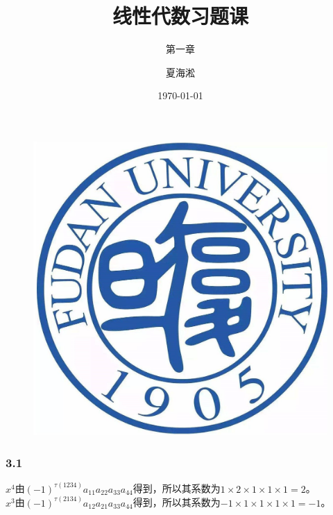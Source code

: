 \documentclass{beamer}
\author{夏海淞}
\title{线性代数习题课}
\subtitle{第一章}
\date{\today}
\begin{document}
\begin{frame}
    \titlepage
    \begin{figure}[htpb]
        \begin{center}
            \vspace*{-0.5cm}
            \includegraphics[width=0.1\linewidth]{pic/FDU.jpeg}
        \end{center}
    \end{figure}

\end{frame}


\begin{frame}
    \frametitle{3.1}
    \(x^4\)由\((-1)^{\tau(1234)}a_{11}a_{22}a_{33}a_{44}\)得到，所以其系数为\(1\times2\times1\times1\times1=2\)。\\
    \(x^3\)由\((-1)^{\tau(2134)}a_{12}a_{21}a_{33}a_{44}\)得到，所以其系数为\(-1\times1\times1\times1\times1=-1\)。\\

\end{frame}

%     
\end{document}
